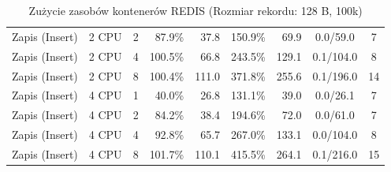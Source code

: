 \begin{table}[ht]
{\begin{tabular}{llcrrrrcc}
Zapis (Insert) & 2 CPU & 2 & 87.9\% & 37.8 & 150.9\% & 69.9 & 0.0/59.0 & 7 \\
Zapis (Insert) & 2 CPU & 4 & 100.5\% & 66.8 & 243.5\% & 129.1 & 0.1/104.0 & 8 \\
Zapis (Insert) & 2 CPU & 8 & 100.4\% & 111.0 & 371.8\% & 255.6 & 0.1/196.0 & 14 \\
Zapis (Insert) & 4 CPU & 1 & 40.0\% & 26.8 & 131.1\% & 39.0 & 0.0/26.1 & 7 \\
Zapis (Insert) & 4 CPU & 2 & 84.2\% & 38.4 & 194.6\% & 72.0 & 0.0/61.0 & 7 \\
Zapis (Insert) & 4 CPU & 4 & 92.8\% & 65.7 & 267.0\% & 133.1 & 0.0/104.0 & 8 \\
Zapis (Insert) & 4 CPU & 8 & 101.7\% & 110.1 & 415.5\% & 264.1 & 0.1/216.0 & 15 \\
\bottomrule
\end{tabular}%
}
\caption{Zużycie zasobów kontenerów REDIS (Rozmiar rekordu: 128 B, 100k)}
\label{tab:resources_redis_small_100000}
\end{table}
